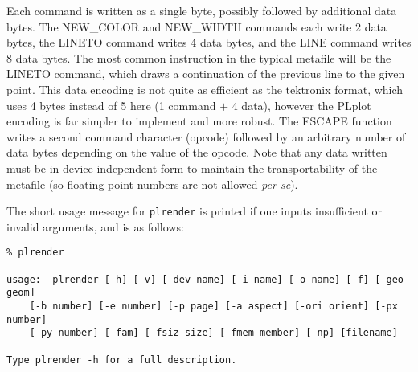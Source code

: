 Each command is written as a single byte, possibly followed by additional
data bytes.  The NEW\_COLOR and NEW\_WIDTH commands each write 2 data
bytes, the LINETO command writes 4 data bytes, and the LINE command writes
8 data bytes.  The most common instruction in the typical metafile will be
the LINETO command, which draws a continuation of the previous line to the
given point.  This data encoding is not quite as efficient as the tektronix
format, which uses 4 bytes instead of 5 here (1 command $+$ 4 data),
however the PLplot encoding is far simpler to implement and more robust.
The ESCAPE function writes a second command character (opcode) followed by
an arbitrary number of data bytes depending on the value of the opcode.
Note that any data written must be in device independent form to maintain
the transportability of the metafile (so floating point numbers are not
allowed {\it per se}). 

The short usage message for {\tt plrender} is printed if one inputs
insufficient or invalid arguments, and is as follows:
\begin{verbatim}
% plrender

usage:  plrender [-h] [-v] [-dev name] [-i name] [-o name] [-f] [-geo geom]
    [-b number] [-e number] [-p page] [-a aspect] [-ori orient] [-px number]
    [-py number] [-fam] [-fsiz size] [-fmem member] [-np] [filename]

Type plrender -h for a full description.
\end{verbatim}

